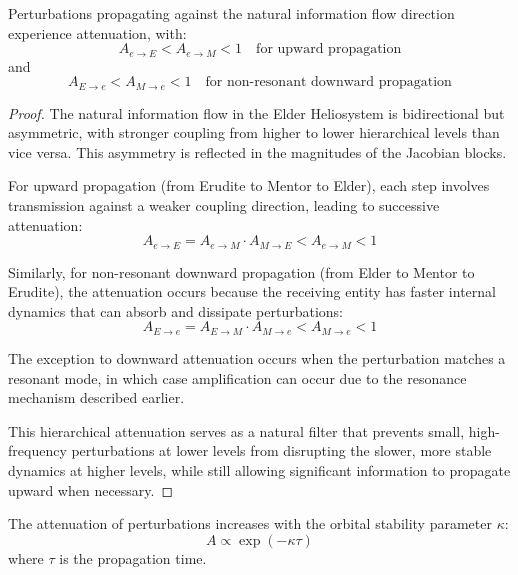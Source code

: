 \begin{theorem}
Perturbations propagating against the natural information flow direction experience attenuation, with:
\begin{equation}
A_{e \to E} < A_{e \to M} < 1 \quad \text{for upward propagation}
\end{equation}
and
\begin{equation}
A_{E \to e} < A_{M \to e} < 1 \quad \text{for non-resonant downward propagation}
\end{equation}
\end{theorem}

\begin{proof}
The natural information flow in the Elder Heliosystem is bidirectional but asymmetric, with stronger coupling from higher to lower hierarchical levels than vice versa. This asymmetry is reflected in the magnitudes of the Jacobian blocks.

For upward propagation (from Erudite to Mentor to Elder), each step involves transmission against a weaker coupling direction, leading to successive attenuation:
\begin{equation}
A_{e \to E} = A_{e \to M} \cdot A_{M \to E} < A_{e \to M} < 1
\end{equation}

Similarly, for non-resonant downward propagation (from Elder to Mentor to Erudite), the attenuation occurs because the receiving entity has faster internal dynamics that can absorb and dissipate perturbations:
\begin{equation}
A_{E \to e} = A_{E \to M} \cdot A_{M \to e} < A_{M \to e} < 1
\end{equation}

The exception to downward attenuation occurs when the perturbation matches a resonant mode, in which case amplification can occur due to the resonance mechanism described earlier.

This hierarchical attenuation serves as a natural filter that prevents small, high-frequency perturbations at lower levels from disrupting the slower, more stable dynamics at higher levels, while still allowing significant information to propagate upward when necessary.
\end{proof}

\begin{theorem}
The attenuation of perturbations increases with the orbital stability parameter $\kappa$:
\begin{equation}
A \propto \exp(-\kappa \tau)
\end{equation}
where $\tau$ is the propagation time.
\end{theorem}

